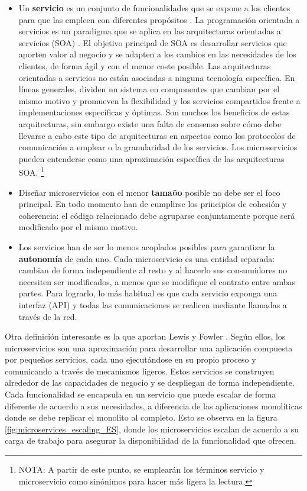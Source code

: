 \documentclass[11pt,spanish,listoffigures]{tfgetsinf}
\begin{document}
\begin{itemize}

\item Un \textbf{servicio} es un conjunto de funcionalidades que se expone a los clientes para que las empleen con diferentes propósitos \cite{Wikipedia}. La programación orientada a servicios es un paradigma que se aplica en las arquitecturas orientadas a servicios (SOA) \cite{Arsanjani2009a}. El objetivo principal de SOA es desarrollar servicios que aporten valor al negocio y se adapten a los cambios en las necesidades de los clientes, de forma ágil y con el menor coste posible. Las arquitecturas orientadas a servicios no están asociadas a ninguna tecnología específica. En líneas generales, dividen un sistema en componentes que cambian por el mismo motivo y promueven la flexibilidad y los servicios compartidos frente a implementaciones específicas y óptimas. Son muchos los beneficios de estas arquitecturas, sin embargo existe una falta de consenso sobre cómo debe llevarse a cabo este tipo de arquitecturas en aspectos como los protocolos de comunicación a emplear o la granularidad de los servicios. Los microservicios pueden entenderse como una aproximación específica de las arquitecturas SOA. \footnote{ NOTA: A partir de este punto, se emplearán los términos servicio y microservicio como sinónimos para hacer más ligera la lectura.}

\item Diseñar microservicios con el menor \textbf{tamaño} posible no debe ser el foco principal. En todo momento han de cumplirse los principios de cohesión y coherencia: el código relacionado debe agruparse conjuntamente porque será modificado por el mismo motivo.

\item  Los servicios han de ser lo menos acoplados posibles para garantizar la \textbf{autonomía} de cada uno. Cada microservicio es una entidad separada: cambian de forma independiente al resto y al hacerlo sus consumidores no necesiten ser modificados, a menos que se modifique el contrato entre ambas partes. Para lograrlo, lo más habitual es que cada servicio exponga una interfaz (API) y todas las comunicaciones se realicen mediante llamadas a través de la red.

\end{itemize}

Otra definición interesante es la que aportan Lewis y Fowler \cite{Lewis2014}. Según ellos, los microservicios son una aproximación para desarrollar una aplicación compuesta por pequeños servicios, cada uno ejecutándose en su propio proceso y comunicando a través de mecanismos ligeros. Estos servicios se construyen alrededor de las capacidades de negocio y se despliegan de forma independiente. Cada funcionalidad se encapsula en un servicio que puede escalar de forma diferente de acuerdo a sus necesidades, a diferencia de las aplicaciones monolíticas donde se debe replicar el monolito al completo. Esto se observa en la figura \ref{fig:microservices_escaling_ES}, donde los microservicios escalan de acuerdo a su carga de trabajo para asegurar la disponibilidad de la funcionalidad que ofrecen.
\end{document}
